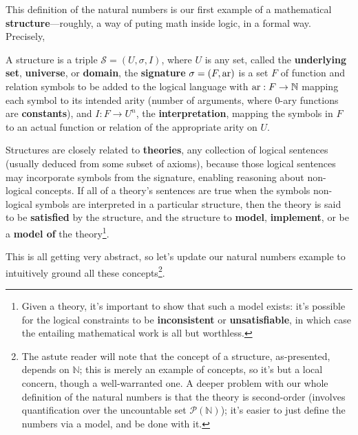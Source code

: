 This definition of the natural numbers is our first example of a mathematical \textbf{structure}---roughly, a way of puting math inside logic,
in a formal way.
Precisely,
\begin{definition}
  A structure is a triple $\mathcal{S} = (U, \sigma, I)$, where $U$ is any set, called the \textbf{underlying set}, \textbf{universe},
  or \textbf{domain}, the \textbf{signature} $\sigma = (F, \operatorname{ar})$ is a set $F$ of function and relation symbols to be added to the logical language
  with $\operatorname{ar}: F \to \mathbb{N}$ mapping each symbol to its intended arity (number of arguments, where 0-ary functions are \textbf{constants}),
  and $I: F \to U^{n}$, the \textbf{interpretation}, mapping the symbols in $F$ to an actual function or relation of the appropriate arity on $U$.
\end{definition}

Structures are closely related to \textbf{theories}, any collection of logical sentences (usually deduced from some subset of axioms),
because those logical sentences may incorporate symbols from the signature, enabling reasoning about non-logical concepts.
If all of a theory's sentences are true when the symbols non-logical symbols are interpreted in a particular structure,
then the theory is said to be \textbf{satisfied} by the structure, and the structure to \textbf{model}, \textbf{implement},
or be a \textbf{model of} the theory\footnote
{
  Given a theory, it's important to show that such a model exists: it's possible for the logical constraints to be \textbf{inconsistent}
  or \textbf{unsatisfiable}, in which case the entailing mathematical work is all but worthless.
}.

This is all getting very abstract, so let's update our natural numbers example to intuitively ground all these concepts\footnote
{
  The astute reader will note that the concept of a structure, as-presented, depends on $\mathbb{N}$; this is merely an example of concepts,
  so it's but a local concern, though a well-warranted one.
  A deeper problem with our whole definition of the natural numbers is that the theory is second-order
  (involves quantification over the uncountable set $\mathcal{P}(\mathbb{N})$); it's easier to just define the numbers via a model,
  and be done with it.
}.

